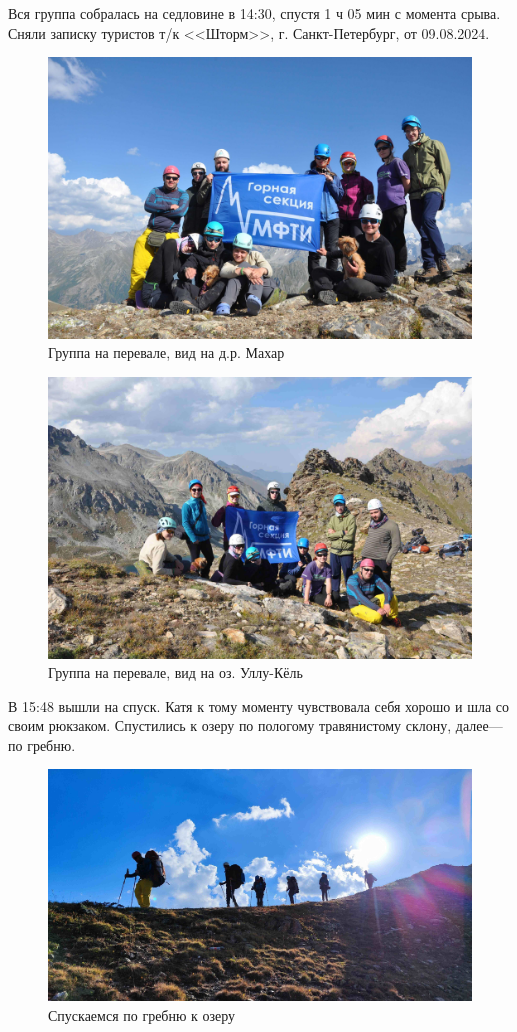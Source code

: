 Вся группа собралась на седловине в 14:30, спустя 1 ч 05 мин с момента срыва. Сняли записку туристов т/к <<Шторм>>, г. Санкт-Петербург, от 09.08.2024.
\begin{figure}[h!]
	\centering
	\includegraphics[width=0.7\linewidth]{../pics/DSC_0982}
	\caption{Группа на перевале, вид на д.р. Махар}
	\label{fig:DSC_0982}
\end{figure}
\begin{figure}[h!]
	\centering
	\includegraphics[width=0.7\linewidth]{../pics/DSC_0986}
	\caption{Группа на перевале, вид на оз. Уллу-Кёль}
	\label{fig:DSC_0986}
\end{figure}

В 15:48 вышли на спуск. Катя к тому моменту чувствовала себя хорошо и шла со своим рюкзаком.
Спустились к озеру по пологому травянистому склону, далее--- по гребню.
\begin{figure}[h!]
	\centering
	\includegraphics[width=0.7\linewidth]{../pics/IMG_20240820_164917.jpg}
	\caption{Спускаемся по гребню к озеру}
	\label{fig:IMG_20240820_164917.jpg}
\end{figure}


